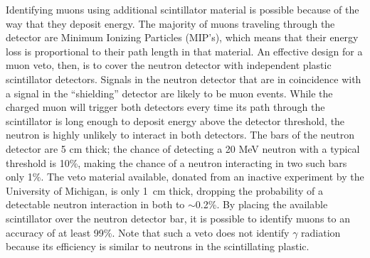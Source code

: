 Identifying muons using additional scintillator material is possible because of the way that they deposit energy.  The majority of muons traveling through the detector are Minimum Ionizing Particles (MIP's), which means that their energy loss is proportional to their path length in that material.  An effective design for a muon veto, then, is to cover the neutron detector with independent plastic scintillator detectors.  Signals in the neutron detector that are in coincidence with a signal in the ``shielding'' detector are likely to be muon events.  While the charged muon will trigger both detectors every time its path through the scintillator is long enough to deposit energy above the detector threshold, the neutron is highly unlikely to interact in both detectors.  The bars of the neutron detector are 5 cm thick; the chance of detecting a 20 MeV neutron with a typical threshold is 10\%, making the chance of a neutron interacting in two such bars only 1\%.  The veto material available, donated from an inactive experiment by the University of Michigan, is only 1~cm thick, dropping the probability of a detectable neutron interaction in both to $\sim$0.2\%.  By placing the available scintillator over the neutron detector bar, it is possible to identify muons to an accuracy of at least 99\%.  Note that such a veto does not identify $\gamma$ radiation because its efficiency is similar to neutrons in the scintillating plastic. 


